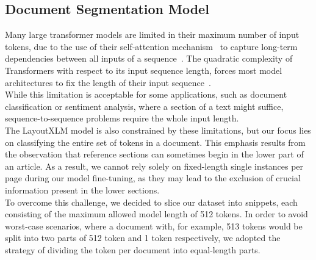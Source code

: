 \subsection{Document Segmentation Model}\label{sec:doc_model}
Many large transformer models are limited in their maximum number of input tokens, due to the use of their self-attention mechanism~\cite{vaswani2017attention} to capture long-term dependencies between all inputs of a sequence~\cite{devlin2019bert,liu2019roberta,sanh2019distilbert}. The quadratic complexity of Transformers with respect to its input sequence length, forces most model architectures to fix the length of their input sequence~\cite{wang2020linformer}.\\
While this limitation is acceptable for some applications, such as document classification or sentiment analysis, where a section of a text might suffice, sequence-to-sequence problems require the whole input length.\\
The LayoutXLM model is also constrained by these limitations, but our focus lies on classifying the entire set of tokens in a document. This emphasis results from the observation that reference sections can sometimes begin in the lower part of an article. As a result, we cannot rely solely on fixed-length single instances per page during our model fine-tuning, as they may lead to the exclusion of crucial information present in the lower sections.\\
To overcome this challenge, we decided to slice our dataset into snippets, each consisting of the maximum allowed model length of 512 tokens. In order to avoid worst-case scenarios, where a document with, for example, 513 tokens would be split into two parts of 512 token and 1 token respectively, we adopted the strategy of dividing the token per document into equal-length parts.\\

